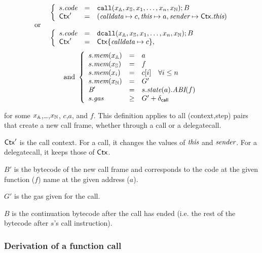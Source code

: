 $$
\begin{array}{ll}
&\left\{
    \begin{array}{lll}
    s.\textit{code} &=&  \mathtt{call}(x_{\mathbb{A}},x_{\mathbb{S}},x_1,\dots,x_n, x_{\mathbb{N}});B \\
    \mathsf{Ctx}' &=&(\textit{calldata}\mapsto c,
     \textit{this}\mapsto a,
     \textit{sender}\mapsto\mathsf{Ctx}.\textit{this})
    \end{array}\right.\\
\hbox{ or }&\\
&\left\{
    \begin{array}{lll}
    s.\textit{code} &=& \mathtt{dcall}(x_{\mathbb{A}},x_{\mathbb{S}},x_1,\dots,x_n, x_{\mathbb{N}});B \\
    \mathsf{Ctx}'&=&\mathsf{Ctx}\{\textit{calldata}\mapsto c\},
    \end{array}
    \right.
\end{array}
$$
$$
\begin{array}{cc}
\hbox{and }
\left\{
    \begin{array}{lll}
    s.\textit{mem}(x_{\mathbb{A}}) & = & a \\
    s.\textit{mem}(x_{\mathbb{S}}) & = & f \\
    s.\textit{mem}(x_i) & = & c[i]\quad \forall i\leq n \\
    s.\textit{mem}(x_{\mathbb{N}}) & = & G' \\
    \textit{B}{}' &=& s.\textit{state}(a).\textit{ABI}(f)\\
    s.\textit{gas} &\geq& G' + \delta_{\mathsf{call}}
    \end{array}\right.
\end{array}
$$

for some $x_{\mathbb{A}}$,\dots,$x_{\mathbb{N}}$, $c$,$a$, and $f$. This definition applies to all (context,step) pairs that create a new call frame, whether through a call or a delegatecall. 

$\mathsf{Ctx}'$ is the call context. For a call, it changes the values of $\textit{this}$ and $\textit{sender}$. For a delegatecall, it keeps those of $\mathsf{Ctx}$. 

$B'$ is the bytecode of the new call frame and corresponds to the code at the given function ($f$) name at the given address ($a$). 

$G'$ is the gas given for the call. 

$B$ is the continuation bytecode after the call has ended (i.e. the rest of the bytecode after $s$'s call instruction).

\subsubsection{Derivation of a function call}

